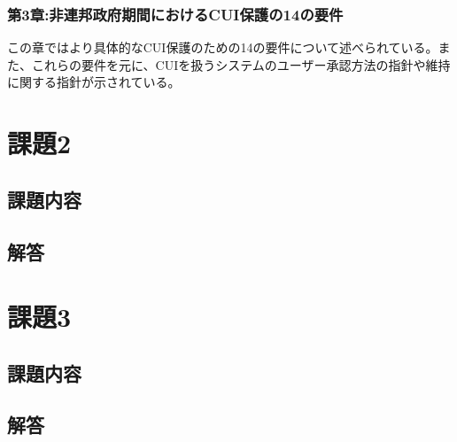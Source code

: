 \documentclass{article}[jsarticle]
\begin{document}
\subsubsection{第3章:非連邦政府期間におけるCUI保護の14の要件}
この章ではより具体的なCUI保護のための14の要件について述べられている。また、これらの要件を元に、CUIを扱うシステムのユーザー承認方法の指針や維持に関する指針が示されている。

\section{課題2}
\subsection{課題内容}
\subsection{解答}

\section{課題3}
\subsection{課題内容}
\subsection{解答}
\end{document}

